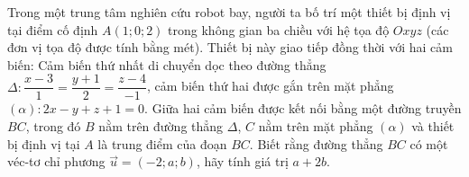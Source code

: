 \begin{bt}%
	 Trong một trung tâm nghiên cứu robot bay, người ta bố trí một thiết bị định vị tại điểm cố định $A(1;0;2)$ trong không gian ba chiều với hệ tọa độ $Oxyz$ (các đơn vị tọa độ được tính bằng mét). Thiết bị này giao tiếp đồng thời với hai cảm biến: Cảm biến thứ nhất di chuyển dọc theo đường thẳng $\Delta\colon \dfrac{x-3}{1} = \dfrac{y+1}{2} = \dfrac{z-4}{-1}$, cảm biến thứ hai được gắn trên mặt phẳng $(\alpha)\colon 2x-y+z+1=0$. Giữa hai cảm biến được kết nối bằng một đường truyền $BC$, trong đó $B$ nằm trên đường thẳng $\Delta$, $C$ nằm trên mặt phẳng $(\alpha)$ và thiết bị định vị tại $A$ là trung điểm của đoạn $BC$. Biết rằng đường thẳng $BC$ có một véc-tơ chỉ phương $\overrightarrow{u}=(-2;a;b)$, hãy tính giá trị $a+2b$.
\end{bt}

